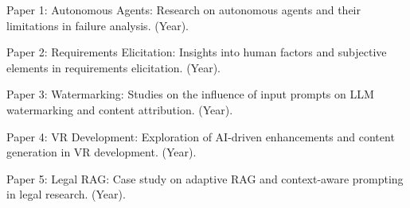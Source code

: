 \documentclass{article}
\newcommand{\paperone}{Paper 1: Autonomous Agents}
\newcommand{\papertwo}{Paper 2: Requirements Elicitation}
\newcommand{\paperthree}{Paper 3: Watermarking}
\newcommand{\paperfour}{Paper 4: VR Development}
\newcommand{\paperfive}{Paper 5: Legal RAG}
\begin{document}
\begin{thebibliography}{99}

\paperone: Research on autonomous agents and their limitations in failure analysis. (Year).

\papertwo: Insights into human factors and subjective elements in requirements elicitation. (Year).

\paperthree: Studies on the influence of input prompts on LLM watermarking and content attribution. (Year).

\paperfour: Exploration of AI-driven enhancements and content generation in VR development. (Year).

\paperfive: Case study on adaptive RAG and context-aware prompting in legal research. (Year).

\end{thebibliography}
\end{document}
